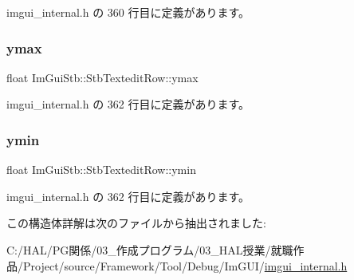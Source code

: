  imgui\+\_\+internal.\+h の 360 行目に定義があります。

\mbox{\label{struct_im_gui_stb_1_1_stb_textedit_row_a24b4b9e6983914519d01335b4014a774}} 
\subsubsection{\texorpdfstring{ymax}{ymax}}
{\footnotesize\ttfamily float Im\+Gui\+Stb\+::\+Stb\+Textedit\+Row\+::ymax}



 imgui\+\_\+internal.\+h の 362 行目に定義があります。

\mbox{\label{struct_im_gui_stb_1_1_stb_textedit_row_a0c8be0676857e3a182ab73d1782e5da0}} 
\subsubsection{\texorpdfstring{ymin}{ymin}}
{\footnotesize\ttfamily float Im\+Gui\+Stb\+::\+Stb\+Textedit\+Row\+::ymin}



 imgui\+\_\+internal.\+h の 362 行目に定義があります。



この構造体詳解は次のファイルから抽出されました\+:\begin{DoxyCompactItemize}
\item 
C\+:/\+H\+A\+L/\+P\+G関係/03\+\_\+作成プログラム/03\+\_\+\+H\+A\+L授業/就職作品/\+Project/source/\+Framework/\+Tool/\+Debug/\+Im\+G\+U\+I/\mbox{\hyperlink{imgui__internal_8h}{imgui\+\_\+internal.\+h}}\end{DoxyCompactItemize}
